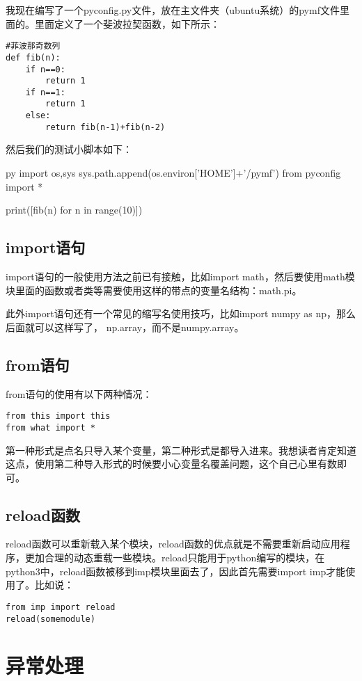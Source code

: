 \documentclass[12pt,oneside]{book}
\begin{document}
\begin{common-format}
我现在编写了一个pyconfig.py文件，放在主文件夹（ubuntu系统）的pymf文件里面的。里面定义了一个斐波拉契函数，如下所示：
\begin{Verbatim}
#菲波那奇数列
def fib(n):
    if n==0:
        return 1
    if n==1:
        return 1
    else:
        return fib(n-1)+fib(n-2)
\end{Verbatim}

然后我们的测试小脚本如下：
\begin{xverbatim}[129]{py}
import os,sys
sys.path.append(os.environ['HOME']+'/pymf')
from pyconfig import *

print([fib(n) for n in range(10)])
\end{xverbatim}


\section{import语句}
import语句的一般使用方法之前已有接触，比如import math，然后要使用math模块里面的函数或者类等需要使用这样的带点的变量名结构：math.pi。

此外import语句还有一个常见的缩写名使用技巧，比如import numpy as np，那么后面就可以这样写了， np.array，而不是numpy.array。


\section{from语句}
from语句的使用有以下两种情况：
\begin{Verbatim}
from this import this
from what import *
\end{Verbatim}
第一种形式是点名只导入某个变量，第二种形式是都导入进来。我想读者肯定知道这点，使用第二种导入形式的时候要小心变量名覆盖问题，这个自己心里有数即可。



\section{reload函数}
reload函数可以重新载入某个模块，reload函数的优点就是不需要重新启动应用程序，更加合理的动态重载一些模块。reload只能用于python编写的模块，在python3中，reload函数被移到imp模块里面去了，因此首先需要import imp才能使用了。比如说：
\begin{Verbatim}
from imp import reload
reload(somemodule)
\end{Verbatim}




\chapter{异常处理}






\end{common-format}
\end{document}
